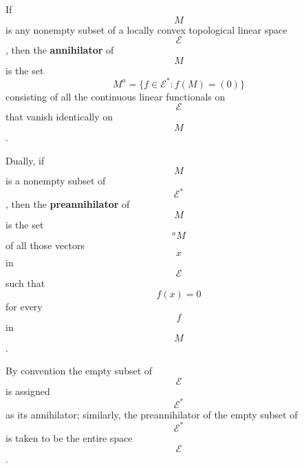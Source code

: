 If $$M$$ is any nonempty subset of a locally convex topological linear space $$\mathcal{E}$$, then the \textbf{annihilator} of $$M$$ is the set
$$M^a = \{ f \in \mathcal{E}^* : f(M) = (0) \}$$
consisting of all the continuous linear functionals on $$\mathcal{E}$$ that vanish identically on $$M$$.

Dually, if $$M$$ is a nonempty subset of $$\mathcal{E}^*$$, then the \textbf{preannihilator} of $$M$$ is the set $${}^a M$$ of all those vectors $$x$$ in $$\mathcal{E}$$ such that $$f(x) = 0$$ for every $$f$$ in $$M$$.

By convention the empty subset of $$\mathcal{E}$$ is assigned $$\mathcal{E}^*$$ as its annihilator; similarly, the preannihilator of the empty subset of $$\mathcal{E}^*$$ is taken to be the entire space $$\mathcal{E}$$.
